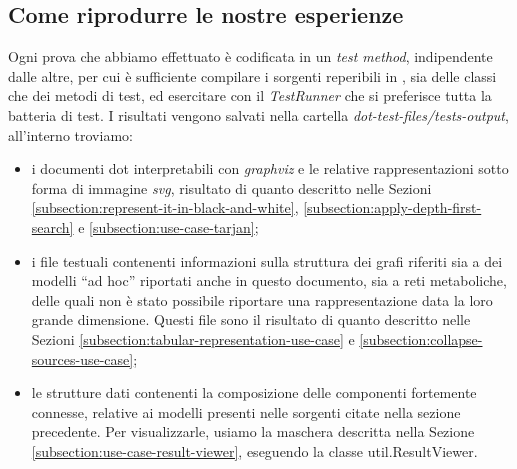\subsection{Come riprodurre le nostre esperienze}
Ogni prova che abbiamo effettuato \`e codificata in un \emph{test
  method}, indipendente dalle altre, per cui \`e sufficiente compilare
i sorgenti reperibili in \cite{MyJavaImpl}, sia delle classi che dei
metodi di test, ed esercitare con il \emph{TestRunner} che si
preferisce tutta la batteria di test. I risultati vengono salvati
nella cartella \emph{dot-test-files/tests-output}, all'interno
troviamo:
\begin{itemize}
\item i documenti dot interpretabili con \emph{graphviz} e le relative
  rappresentazioni sotto forma di immagine \emph{svg}, risultato di
  quanto descritto nelle Sezioni
  \ref{subsection:represent-it-in-black-and-white},
  \ref{subsection:apply-depth-first-search} e
  \ref{subsection:use-case-tarjan};
\item i file testuali contenenti informazioni sulla struttura dei
  grafi riferiti sia a dei modelli ``ad hoc'' riportati anche in
  questo documento, sia a reti metaboliche, delle quali non \`e stato
  possibile riportare una rappresentazione data la loro grande
  dimensione. Questi file sono il risultato di quanto descritto nelle
  Sezioni \ref{subsection:tabular-representation-use-case} e
  \ref{subsection:collapse-sources-use-case};
\item le strutture dati contenenti la composizione delle componenti
  fortemente connesse, relative ai modelli presenti nelle sorgenti
  citate nella sezione precedente. Per visualizzarle, usiamo la
  maschera descritta nella Sezione
  \ref{subsection:use-case-result-viewer}, eseguendo la classe
  util.ResultViewer.
\end{itemize}


